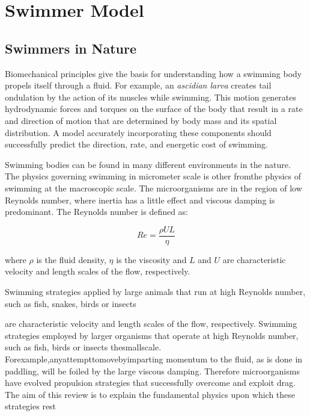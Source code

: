 

\chapter{Swimmer Model}
\label{chap:chapter_2}

\section{Swimmers in Nature}
\label{sec:section_1}


Biomechanical principles give the basis for understanding how a swimming body propels itself through a fluid\cite{mchenry_morphology_2005}. For example, an \textit{ascidian larva} creates
\cite{sawada_biology_2001} tail ondulation by the action of its muscles while swimming. This motion generates hydrodynamic forces and torques on the surface of the body that result in a rate and direction
of motion that are determined by body mass and its spatial distribution. A model accurately incorporating these components should successfully predict the direction, rate, and 
energetic cost of swimming.\par
Swimming bodies can be found in many different environments in the nature. The physics governing swimming in micrometer scale is other fromthe physics of swimming at the macroscopic
scale. The microorganisms are in the region of low Reynolds number, where inertia has a little effect and viscous damping is predominant. The Reynolds number is defined as:

\begin{equation} 
  Re = \frac {\rho UL}{\eta}
\end{equation}

where $\rho$ is the fluid density, $\eta$ is the viscosity and $L$ and $U$ are characteristic velocity and length scales of the flow, respectively.\par

Swimming strategies applied by large animals that run at high Reynolds number, such as fish, snakes, birds or insects\cite{childress_mechanics_1981}


are characteristic velocity and
length scales of the flow, respectively. Swimming strategies
employed by larger organisms that operate at high Reynolds
number, such as fish, birds or insects 
thesmallscale. Forexample,anyattempttomovebyimparting
momentum to the fluid, as is done in paddling, will be foiled
by the large viscous damping. Therefore microorganisms
have evolved propulsion strategies that successfully overcome
and exploit drag. The aim of this review is to explain the
fundamental physics upon which these strategies rest

